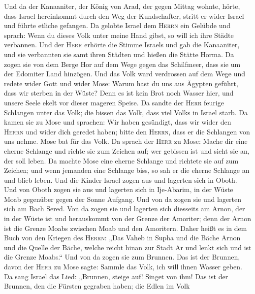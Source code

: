  Und da der Kanaaniter, der König von Arad, der gegen
Mittag wohnte, hörte, dass Israel hereinkommt durch den Weg der
Kundschafter, stritt er wider Israel und führte etliche gefangen.
 Da gelobte Israel dem \textsc{Herrn} ein Gelübde und
sprach: Wenn du dieses Volk unter meine Hand gibst, so will ich ihre
Städte verbannen.  Und der \textsc{Herr} erhörte die
Stimme Israels und gab die Kanaaniter, und sie verbannten sie samt ihren
Städten und hießen die Stätte Horma.  Da zogen sie von dem
Berge Hor auf dem Wege gegen das Schilfmeer, dass sie um der Edomiter
Land hinzögen. Und das Volk ward verdrossen auf dem Wege 
und redete wider Gott und wider Mose: Warum hast du uns aus Ägypten
geführt, dass wir sterben in der Wüste? Denn es ist kein Brot noch
Wasser hier, und unsere Seele ekelt vor dieser mageren Speise.
 Da sandte der \textsc{Herr} feurige Schlangen unter das
Volk; die bissen das Volk, dass viel Volks in Israel starb.
 Da kamen sie zu Mose und sprachen: Wir haben gesündigt,
dass wir wider den \textsc{Herrn} und wider dich geredet haben; bitte
den \textsc{Herrn}, dass er die Schlangen von uns nehme. Mose bat für
das Volk.  Da sprach der \textsc{Herr} zu Mose: Mache dir
eine eherne Schlange und richte sie zum Zeichen auf; wer gebissen ist
und sieht sie an, der soll leben.  Da machte Mose eine
eherne Schlange und richtete sie auf zum Zeichen; und wenn jemanden eine
Schlange biss, so sah er die eherne Schlange an und blieb leben.
 Und die Kinder Israel zogen aus und lagerten sich in
Oboth.  Und von Oboth zogen sie aus und lagerten sich in
Ije-Abarim, in der Wüste Moab gegenüber gegen der Sonne Aufgang.
 Und von da zogen sie und lagerten sich am Bach Sered.
 Von da zogen sie und lagerten sich diesseits am Arnon,
der in der Wüste ist und herauskommt von der Grenze der Amoriter; denn
der Arnon ist die Grenze Moabs zwischen Moab und den Amoritern.
 Daher heißt es in dem Buch von den Kriegen des
\textsc{Herrn}: „Das Vaheb in Supha und die Bäche Arnon 
und die Quelle der Bäche, welche reicht hinan zur Stadt Ar und lenkt
sich und ist die Grenze Moabs.``  Und von da zogen sie
zum Brunnen. Das ist der Brunnen, davon der \textsc{Herr} zu Mose sagte:
Sammle das Volk, ich will ihnen Wasser geben.  Da sang
Israel das Lied: „Brunnen, steige auf! Singet von ihm! 
Das ist der Brunnen, den die Fürsten gegraben haben; die Edlen im Volk
